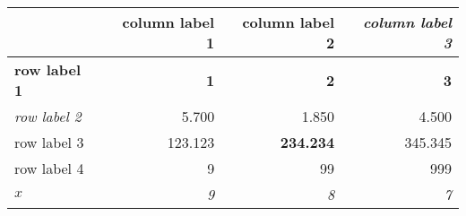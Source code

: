 \begin{tabular}{lrrr} 
\toprule 
  	 & 	 \textbf{column label 1} 	 & 	 column label 2 	 & 	 \textit{column label 3} \\ 
\midrule 
\textbf{row label 1} 	 & 	 \textbf{1} 	 & 	 \textbf{2} 	 & 	 \textbf{3} \\ 
\textit{row label 2} 	 & 	 5.700 	 & 	 1.850 	 & 	 4.500 \\ 
row label 3 	 & 	 123.123 	 & 	 \textbf{234.234} 	 & 	 345.345 \\ 
row label 4 	 & 	 9 	 & 	 99 	 & 	 999 \\ 
\textit{$x$} 	 & 	 \textit{9} 	 & 	 \textit{8} 	 & 	 \textit{7} \\ 
\bottomrule 
\end{tabular}